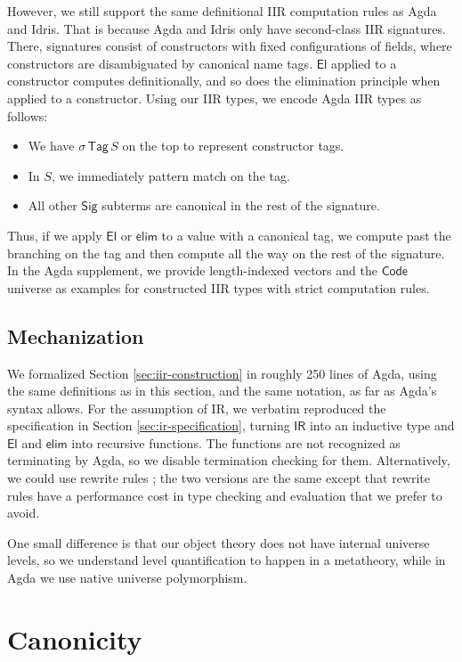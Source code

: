 \documentclass[acmsmall,screen,review]{acmart}
\newcommand{\msf}[1]{{\mathsf{#1}}}
\newcommand{\El}{\msf{El}}
\newcommand{\Sig}{\msf{Sig}}
\newcommand{\Code}{\msf{Code}}
\newcommand{\Tag}{\msf{Tag}}
\newcommand{\IR}{\msf{IR}}
\newcommand{\elim}{\msf{elim}}
\begin{document}
However, we still support the same definitional IIR computation rules as Agda and Idris. That is
because Agda and Idris only have second-class IIR signatures. There, signatures consist of
constructors with fixed configurations of fields, where constructors are disambiguated by canonical
name tags. $\El$ applied to a constructor computes definitionally, and so does the elimination
principle when applied to a constructor. Using our IIR types, we encode Agda IIR types as follows:
\begin{itemize}
\item We have $\sigma\,\Tag\,S$ on the top to represent constructor tags.
\item In $S$, we immediately pattern match on the tag.
\item All other $\Sig$ subterms are canonical in the rest of the signature.
\end{itemize}
Thus, if we apply $\El$ or $\elim$ to a value with a canonical tag, we compute past the branching on
the tag and then compute all the way on the rest of the signature. In the Agda supplement, we provide
length-indexed vectors and the $\Code$ universe as examples for constructed IIR types with strict
computation rules.

\subsection{Mechanization}

We formalized Section \ref{sec:iir-construction} in roughly 250 lines of Agda, using the same
definitions as in this section, and the same notation, as far as Agda's syntax allows. For the
assumption of IR, we verbatim reproduced the specification in Section \ref{sec:ir-specification},
turning $\IR$ into an inductive type and $\El$ and $\elim$ into recursive functions. The functions
are not recognized as terminating by Agda, so we disable termination checking for
them. Alternatively, we could use rewrite rules \cite{DBLP:journals/pacmpl/CockxTW21}; the two
versions are the same except that rewrite rules have a performance cost in type checking and
evaluation that we prefer to avoid.

One small difference is that our object theory does not have internal universe levels, so we
understand level quantification to happen in a metatheory, while in Agda we use native universe
polymorphism.

\section{Canonicity}\label{sec:canonicity}
\end{document}
